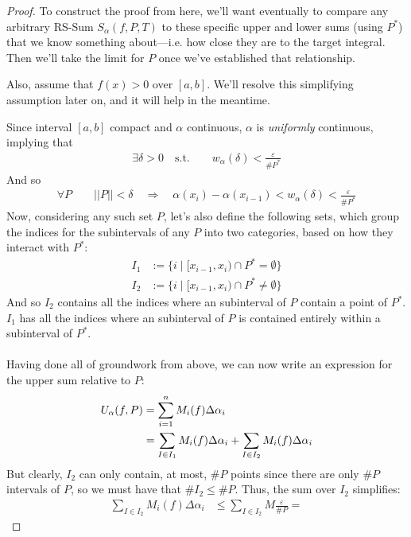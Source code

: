 \documentclass[12pt]{book}
\numberwithin{equation}{section} %
\theoremstyle{plain}
\theoremstyle{definition}
\theoremstyle{remark}
\begin{document}
\begin{proof}
To construct the proof from here, we'll want eventually to compare any
arbitrary RS-Sum $S_\alpha(f,P,T)$ to these specific upper and lower
sums (using $P^*$) that we know something about---i.e. how close they
are to the target integral. Then we'll take the limit for $P$ once we've
established that relationship.

Also, assume that $f(x)>0$ over $[a,b]$. We'll resolve this simplifying
assumption later on, and it will help in the meantime.

Since interval $[a,b]$ compact and $\alpha$ continuous, $\alpha$ is
\emph{uniformly} continuous, implying that
\begin{align*}
  \exists \delta > 0 \quad \text{s.t.} \qquad
  w_\alpha(\delta) < \frac{\varepsilon}{\#P^*}
\end{align*}
And so
\begin{align*}
  \forall P \qquad ||P||<\delta \quad \Rightarrow
      \quad \alpha(x_i) - \alpha(x_{i-1}) < w_\alpha(\delta)
      <  \frac{\varepsilon}{\#P^*}
\end{align*}
Now, considering any such set $P$, let's also define the following sets,
which group the indices for the subintervals of any $P$ into two
categories, based on how they interact with $P^*$:
\begin{align*}
    I_1 &:= \{i \; | \; [x_{i-1},x_i) \cap P^* = \emptyset \}\\
    I_2 &:= \{i \; | \; [x_{i-1},x_i) \cap P^* \neq \emptyset \}
\end{align*}
And so $I_2$ contains all the indices where an subinterval of $P$
contain a point of $P^*$. $I_1$ has all the indices where an subinterval
of $P$ is contained entirely within a subinterval of $P^*$.
\\
\\
Having done all of groundwork from above, we can now write an expression
for the upper sum relative to $P$:
\begin{align}
    U_\alpha(f,P) &= \sum^n_{i=1} M_i(f) \Delta\alpha_i \notag \\
        &= \sum_{I\in I_1} M_i(f) \Delta\alpha_i
         + \sum_{I\in I_2} M_i(f) \Delta\alpha_i
         \label{twosums}
\end{align}
But clearly, $I_2$ can only contain, at most, $\#P$ points since there
are only $\#P$ intervals of $P$, so we must have that $\#I_2 \leq \#P$.
Thus, the sum over $I_2$ simplifies:
\begin{align}
        \sum_{I\in I_2} M_i(f) \Delta\alpha_i
        &\leq \sum_{I\in I_2} M \frac{\varepsilon}{\#P} =

\end{align}
\end{proof}
\end{document}
